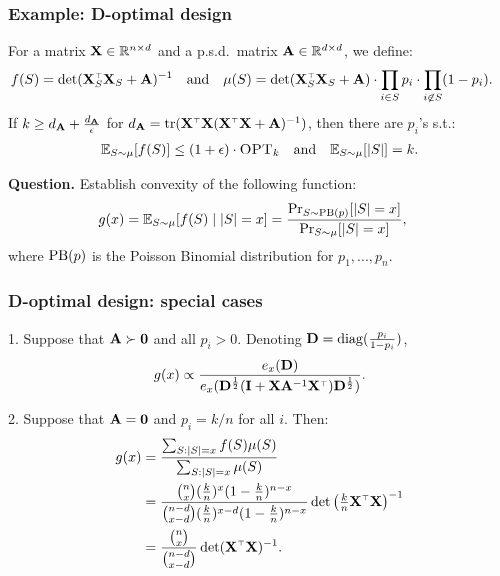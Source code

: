 \documentclass[10pt]{beamer}
\begin{document}
\begin{frame}
  \frametitle{Example: D-optimal design}
  For a matrix $\mathbf X\in\mathbb R^{n\times d}$ and a p.s.d.~matrix
  $\mathbf A\in\mathbb R^{d\times d}$, we define:
  \begin{align*}
   \hspace{-4mm} f(S) = \det(\X_S^\top\X_S+\A)^{-1}\quad\text{and}\quad
    \mu(S)=\det(\X_S^\top\X_S+\A)\cdot\prod_{i\in S}p_i\cdot\prod_{i\not\in S}(1-p_i).
  \end{align*}
  If $k\geq d_{\mathbf A}+\frac{d_{\mathbf A}}\epsilon$ for
  $d_{\A}=\tr(\X^\top\X(\X^\top\X+\A)^{-1})$, then there are $p_i$'s s.t.:
  \begin{align*}
    \mathbb E_{S\sim\mu}[f(S)]\leq(1+\epsilon)\cdot{\textsc{OPT}_k}\quad\text{and}\quad\mathbb E_{S\sim\mu}[|S|]=k.
  \end{align*}
  \vspace{5mm}
  
  \textbf{Question.} Establish convexity of the following function:
  \begin{align*}
    g(x) &=\mathbb E_{S\sim\mu}[f(S)\mid |S|=x] =
           \frac{\mathrm{Pr}_{S\sim{\operatorname{PB}}(p)}[|S|=x]}{\mathrm{Pr}_{S\sim\mu}[|S|=x]},
  \end{align*}
  where ${\operatorname{PB}}(p)$ is the Poisson Binomial distribution for $p_1,...,p_n$.
\end{frame}


\begin{frame}
  \frametitle{D-optimal design: special cases}
1. Suppose that $\mathbf A\succ \mathbf 0$ and all $p_i>0$. Denoting $\mathbf D=\operatorname*{\mathop{\mathrm{diag}}}(\frac{p_i}{1-p_i})$,
  \begin{align*}
    g(x) \propto \frac{e_x(\D)}{e_x(\D^{\frac12}(\I+\X\A^{-1}\X^\top)\D^{\frac12})}.
  \end{align*}
  
2.  Suppose that $\mathbf A=\mathbf 0$ and $p_i=k/n$ for all $i$. Then:
  \begin{align*}
    g(x)
    &=  \frac{\sum_{S:|S|=x}f(S)\mu(S)}{\sum_{S:|S|=x}\mu(S)}
    \\
    &=\frac{{n\choose x}(\frac kn)^x(1-\frac kn)^{n-x}}
      {{n-d \choose x-d}(\frac kn)^{x-d}(1-\frac
      kn)^{n-x}}\det\big(\tfrac kn\X^\top\X\big)^{-1}
    \\
&=\frac{{n\choose x}}{{n-d\choose x-d}}\det(\X^\top\X)^{-1}.
  \end{align*}
\end{frame}
\end{document}
